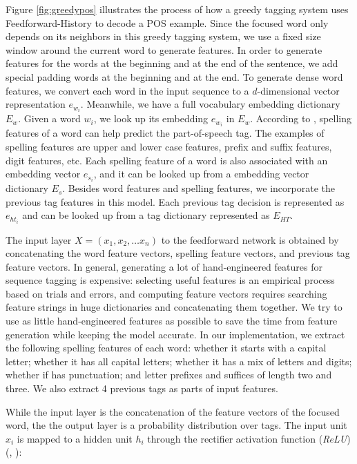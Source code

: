 Figure \ref{fig:greedypos} illustrates the process of how a greedy tagging system uses Feedforward-History to decode a POS example. Since the focused word only depends on its neighbors in this greedy tagging system, we use a fixed size window around the current word to generate features. In order to generate features for the words at the beginning and at the end of the sentence, we add special padding words at the beginning and at the end. To generate dense word features, we convert each word in the input sequence to a $d$-dimensional vector representation $e_{w_{i}}$. Meanwhile, we have a full vocabulary embedding dictionary $E_{w}$. Given a word $w_{i}$, we look up its embedding $e_{w_{i}}$ in $E_{w}$. According to \cite{ratnaparkhi1996maximum}, spelling features of a word can help predict the part-of-speech tag. The examples of spelling features are upper and lower case features, prefix and suffix features, digit features, etc. Each spelling feature of a word is also associated with an embedding vector $e_{s_{i}}$, and it can be looked up from a embedding vector dictionary $E_{s}$. Besides word features and spelling features, we incorporate the previous tag features in this model. Each previous tag decision is represented as $e_{ht_{i}}$ and can be looked up from a tag dictionary represented as $E_{HT}$.

The input layer $X=\left( x_{1},x_{2},\ldots x_{n}\right)$ to the feedforward network is obtained by concatenating the word feature vectors, spelling feature vectors, and previous tag feature vectors. In general, generating a lot of hand-engineered features for sequence tagging is expensive: selecting useful features is an empirical process based on trials and errors, and computing feature vectors requires searching feature strings in huge dictionaries and concatenating them together. We try to use as little hand-engineered features as possible to save the time from feature generation while keeping the model accurate. In our implementation, we extract the following spelling features of each word: whether it starts with a capital letter; whether it has all capital letters; whether it has a mix of letters and digits; whether if has punctuation; and letter prefixes and suffices of length two and three. We also extract 4 previous tags as parts of input features.

While the input layer is the concatenation of the feature vectors of the focused word, the the output layer is a probability distribution over tags. The input unit $x_{i}$ is mapped to a hidden unit $h_{i}$ through the rectifier activation function (\textit{ReLU}) (\citeauthor{nair2010rectified}, \citeyear{nair2010rectified}):

